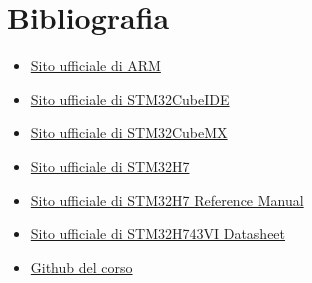 \section{Bibliografia}

\begin{itemize}
    \item \hyperref{https://www.arm.com/}{}{}{Sito ufficiale di ARM}
    \item \hyperref{https://www.st.com/en/development-tools/stm32cubeide.html}{}{}{Sito ufficiale di STM32CubeIDE}
    \item \hyperref{https://www.st.com/en/development-tools/stm32cubemx.html}{}{}{Sito ufficiale di STM32CubeMX}
    \item \hyperref{https://www.st.com/en/microcontrollers-microprocessors/stm32h7-series.html}{}{}{Sito ufficiale di STM32H7}
    \item \hyperref{https://www.st.com/resource/en/reference_manual/dm00314099-stm32h7b3-stm32h7b0-stm32h7a3-stm32h7a3b-stm32h7a1-stm32h7a0-stm32h7b3u-stm32h7b0u-stm32h7a3u-stm32h7a3bu-stm32h7a1u-stm32h7a0u-stm32h7b3v-stm32h7b0v-stm32h7a3v-stm32h7a3bv-stm32h7a1v-stm32h7a0v-stm32h7b3z-stm32h7b0z-stm32h7a3z-stm32h7a3bz-stm32h7a1z-stm32h7a0z-stm32h7b3i-stm32h7b0i-stm32h7a3i-stm32h7a3bi-stm32h7a1i-stm32h7a0i-stm32h7b3c-stm32h7b0c-stm32h7a3c-stm32h7a3bc-stm32h7a1c-stm32h7a0c-stm32h}{}{}{Sito ufficiale di STM32H7 Reference Manual}
    \item \hyperref{https://www.st.com/resource/en/datasheet/stm32h743vi.pdf}{}{}{Sito ufficiale di STM32H743VI Datasheet}
    \item \hyperref{https://www.github.com/ABoldetti/Elettronica}{}{}{Github del corso}
\end{itemize}